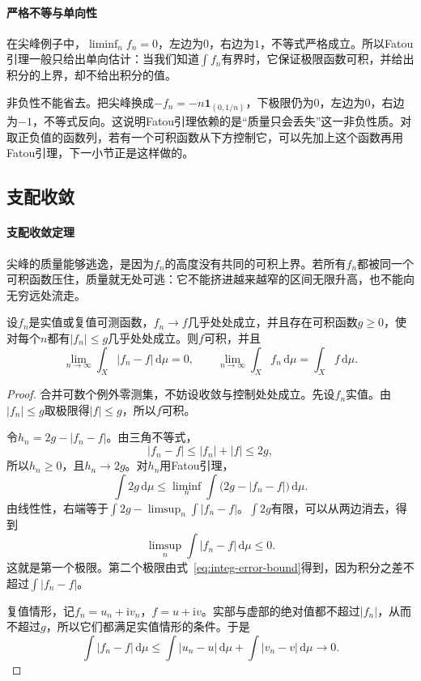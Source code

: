 \paragraph{严格不等与单向性}
在尖峰例子中，$\liminf_nf_n=0$，左边为$0$，右边为$1$，不等式严格成立。所以Fatou引理一般只给出单向估计：当我们知道$\int f_n$有界时，它保证极限函数可积，并给出积分的上界，却不给出积分的值。

非负性不能省去。把尖峰换成$-f_n=-n\mathbf 1_{(0,1/n)}$，下极限仍为$0$，左边为$0$，右边为$-1$，不等式反向。这说明Fatou引理依赖的是“质量只会丢失”这一非负性质。对取正负值的函数列，若有一个可积函数从下方控制它，可以先加上这个函数再用Fatou引理，下一小节正是这样做的。

\subsection{支配收敛}
\label{sec:integ-dominated-convergence}

\paragraph{支配收敛定理}
尖峰的质量能够逃逸，是因为$f_n$的高度没有共同的可积上界。若所有$f_n$都被同一个可积函数压住，质量就无处可逃：它不能挤进越来越窄的区间无限升高，也不能向无穷远处流走。

\begin{theorem}[支配收敛定理]
\label{thm:integ-dominated-convergence}
设$f_n$是实值或复值可测函数，$f_n\to f$几乎处处成立，并且存在可积函数$g\geq0$，使对每个$n$都有$\lvert f_n\rvert\leq g$几乎处处成立。则$f$可积，并且
\begin{equation}
 \lim_{n\to\infty}\int_X\lvert f_n-f\rvert\,\mathrm d\mu=0,\qquad \lim_{n\to\infty}\int_Xf_n\,\mathrm d\mu=\int_Xf\,\mathrm d\mu .
 \label{eq:integ-dominated-convergence}
\end{equation}
\end{theorem}

\begin{proof}
合并可数个例外零测集，不妨设收敛与控制处处成立。先设$f_n$实值。由$\lvert f_n\rvert\leq g$取极限得$\lvert f\rvert\leq g$，所以$f$可积。

令$h_n=2g-\lvert f_n-f\rvert$。由三角不等式，
\[
 \lvert f_n-f\rvert\leq\lvert f_n\rvert+\lvert f\rvert\leq2g,
\]
所以$h_n\geq0$，且$h_n\to2g$。对$h_n$用Fatou引理，
\[
 \int2g\,\mathrm d\mu\leq\liminf_n\int\bigl(2g-\lvert f_n-f\rvert\bigr)\,\mathrm d\mu .
\]
由线性性，右端等于$\int2g-\limsup_n\int\lvert f_n-f\rvert$。$\int2g$有限，可以从两边消去，得到
\[
 \limsup_n\int\lvert f_n-f\rvert\,\mathrm d\mu\leq0 .
\]
这就是第一个极限。第二个极限由式~\eqref{eq:integ-error-bound}得到，因为积分之差不超过$\int\lvert f_n-f\rvert$。

复值情形，记$f_n=u_n+\mathrm iv_n$，$f=u+\mathrm iv$。实部与虚部的绝对值都不超过$\lvert f_n\rvert$，从而不超过$g$，所以它们都满足实值情形的条件。于是
\[
 \int\lvert f_n-f\rvert\,\mathrm d\mu\leq\int\lvert u_n-u\rvert\,\mathrm d\mu+\int\lvert v_n-v\rvert\,\mathrm d\mu\to0 .
\]
\end{proof}

